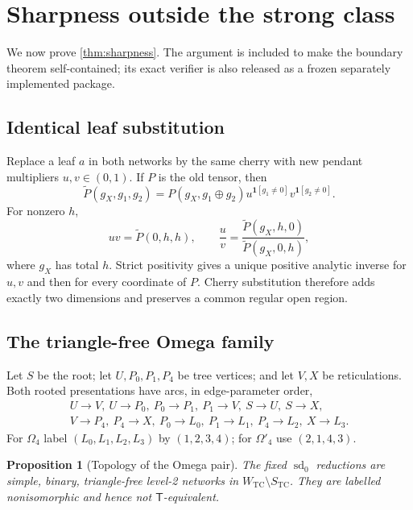 \documentclass[11pt]{article}
\newtheorem{proposition}[theorem]{Proposition}
\theoremstyle{remark}
\newcommand{\TCw}{W_{\mathrm{TC}}}
\newcommand{\TCs}{S_{\mathrm{TC}}}
\newcommand{\Tmove}{\mathsf T}
\newcommand{\xor}{\mathbin\oplus}
\begin{document}
\section{Sharpness outside the strong class}\label{sec:sharpness}

We now prove \cref{thm:sharpness}.  The argument is included to make the
boundary theorem self-contained; its exact verifier is also released as a
frozen separately implemented package.

\subsection{Identical leaf substitution}

Replace a leaf $a$ in both networks by the same cherry with new pendant
multipliers $u,v\in(0,1)$.  If $P$ is the old tensor, then
\begin{equation}\label{eq:cherry}
\widetilde P(g_X,g_1,g_2)=
P(g_X,g_1\xor g_2)
u^{\mathbf1[g_1\ne0]}v^{\mathbf1[g_2\ne0]}.
\end{equation}
For nonzero $h$,
\[
uv=\widetilde P(0,h,h),\qquad
\frac uv=
\frac{\widetilde P(g_X,h,0)}{\widetilde P(g_X,0,h)},
\]
where $g_X$ has total $h$.  Strict positivity gives a unique positive
analytic inverse for $u,v$ and then for every coordinate of $P$.  Cherry
substitution therefore adds exactly two dimensions and preserves a common
regular open region.



\subsection{The triangle-free Omega family}

Let $S$ be the root; let $U,P_0,P_1,P_4$ be tree vertices; and let $V,X$ be
reticulations.  Both rooted presentations have arcs, in edge-parameter order,
\begin{equation}\label{eq:omega-arcs}
\begin{gathered}
U\to V,\ U\to P_0,\ P_0\to P_1,\ P_1\to V,\ S\to U,\ S\to X,\\
V\to P_4,\ P_4\to X,\ P_0\to L_0,\ P_1\to L_1,
\ P_4\to L_2,\ X\to L_3.
\end{gathered}
\end{equation}
For $\Omega_4$ label $(L_0,L_1,L_2,L_3)$ by $(1,2,3,4)$; for
$\Omega'_4$ use $(2,1,4,3)$.



\begin{proposition}[Topology of the Omega pair]\label{prop:omega-topology}
The fixed $\operatorname{sd}_0$ reductions are simple, binary,
triangle-free level-2 networks in $\TCw\setminus\TCs$.  They are labelled
nonisomorphic and hence not $\Tmove$-equivalent.
\end{proposition}
\end{document}
